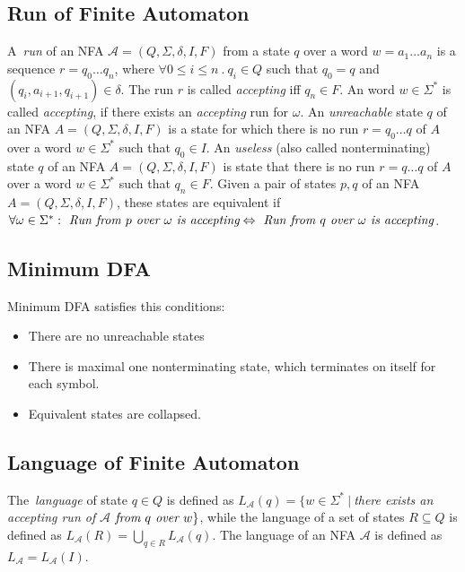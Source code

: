 	\subsection{Run of Finite Automaton}
	\label{defRun}
  A~\emph{run} of an NFA $\mathcal{A}=(Q,\Sigma,\delta,I,F)$ from a state $q$
  over a word $w=a_1\ldots a_n$ is a sequence $r = q_0 \ldots q_n$, where $\forall 0\leq i \leq n\ .\ q_i\in Q$ 
  such that $q_0=q$ and $(q_i,a_{i+1},q_{i+1})\in \delta$. 
  The run $r$ is called \emph{accepting} iff $q_n \in F$. 
	An word $w \in \Sigma^{*}$ is called \emph{accepting}, if there exists an \emph{accepting} run for $\omega$.
  An \emph{unreachable} state $q$ of an NFA $A=(Q,\Sigma,\delta,I,F)$ is a state for which there is no run $r=q_0\ldots q$ of $A$ over a word $w \in \Sigma^{*}$ 
  such that $q_0\in I$.
  An \emph{useless} (also called nonterminating) state $q$ of an NFA $A=(Q,\Sigma,\delta,I,F)$ is state that there is no run $r=q\ldots q$ of $A$ over a word
  $w \in \Sigma^{*}$ such that $q_n \in F$.
  Given a pair of states $p,q$ of an NFA $A=(Q,\Sigma,\delta,I,F)$, these states are equivalent if 
  $\forall \omega \in \Sigma^{*}: \emph{ Run from } p \emph{ over } \omega \emph{ is accepting} \Leftrightarrow 
			\emph{ Run from } q \emph{ over } \omega \emph{ is accepting}$.

	\subsection{Minimum DFA}
	\label{defMinDFA}
	\begin{definition}
		Minimum DFA satisfies this conditions:
		\begin{itemize}
			\item There are no unreachable states
			\item There is maximal one nonterminating state, which terminates on itself for each symbol.
			\item Equivalent states are collapsed.
		\end{itemize}
	\end{definition}


  \subsection{Language of Finite Automaton}
  The~\emph{language} of state $q \in Q$ is defined as 
  $L_\mathcal{A}(q) = \{w\in \Sigma^{*}\ |\ $\emph{there exists an accepting run of }$
  \mathcal{A}$$ 
  \emph{ from }q\emph{ over }w\}$, while the language of a set of states $R\subseteq Q$ is defined as $L_{\mathcal{A}}(R)=\bigcup_{q\in R}L_{\mathcal{A}}(q)$.
  The language of an NFA $\mathcal{A}$ is defined as $L_{\mathcal{A}}=L_{\mathcal{A}}(I)$.

